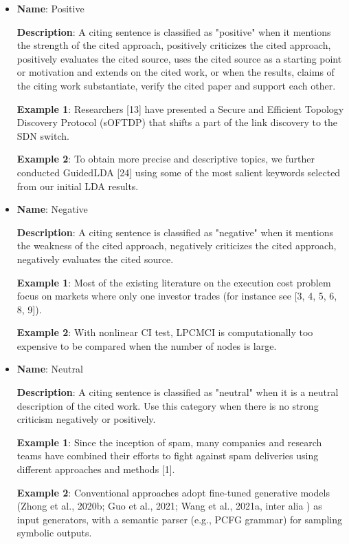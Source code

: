 \documentclass[sigconf]{acmart}
\begin{document}
\begin{itemize}
  \item \textbf{Name}: Positive
  
  \textbf{Description}: A citing sentence is classified as "positive" when it mentions the strength of the cited approach, positively criticizes the cited approach, positively evaluates the cited source, uses the cited source as a starting point or motivation and extends on the cited work, or when the results, claims of the citing work substantiate, verify the cited paper and support each other.
  
  \textbf{Example 1}: Researchers [13] have presented a Secure and Efficient Topology Discovery Protocol (sOFTDP) that shifts a part of the link discovery to the SDN switch.
  
  \textbf{Example 2}: To obtain more precise and descriptive topics, we further conducted GuidedLDA [24] using some of the most salient keywords selected from our initial LDA results.
  
  \item \textbf{Name}: Negative
  
  \textbf{Description}: A citing sentence is classified as "negative" when it mentions the weakness of the cited approach, negatively criticizes the cited approach, negatively evaluates the cited source.
  
  \textbf{Example 1}: Most of the existing literature on the execution cost problem focus on markets where only one investor trades (for instance see [3, 4, 5, 6, 8, 9]).
  
  \textbf{Example 2}: With nonlinear CI test, LPCMCI is computationally too expensive to be compared when the number of nodes is large.

  \item \textbf{Name}: Neutral
  
  \textbf{Description}: A citing sentence is classified as "neutral" when it is a neutral description of the cited work. Use this category when there is no strong criticism negatively or positively.
  
  \textbf{Example 1}: Since the inception of spam, many companies and research teams have combined their efforts to fight against spam deliveries using different approaches and methods [1].
  
  \textbf{Example 2}: Conventional approaches adopt fine-tuned generative models (Zhong et al., 2020b; Guo et al., 2021; Wang et al., 2021a, inter alia ) as input generators, with a semantic parser (e.g., PCFG grammar) for sampling symbolic outputs.
  

\end{itemize}
\end{document}
